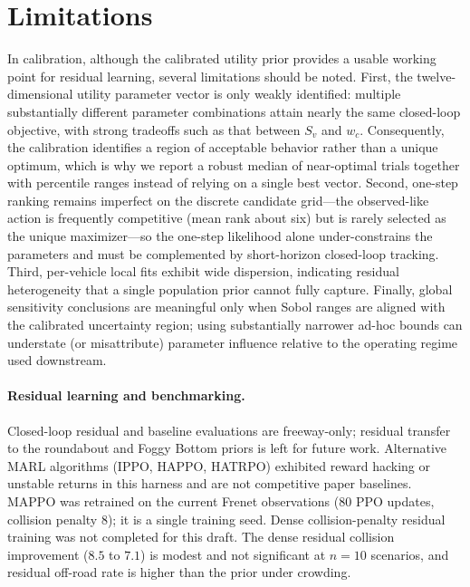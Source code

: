 \documentclass[conference]{IEEEtran}
\begin{document}
\section{Limitations}
In calibration, although the calibrated utility prior provides a usable working point for residual learning, several limitations should be noted. First, the twelve-dimensional utility parameter vector is only weakly identified: multiple substantially different parameter combinations attain nearly the same closed-loop objective, with strong tradeoffs such as that between \(S_v\) and \(w_c\). Consequently, the calibration identifies a region of acceptable behavior rather than a unique optimum, which is why we report a robust median of near-optimal trials together with percentile ranges instead of relying on a single best vector. Second, one-step ranking remains imperfect on the discrete candidate grid---the observed-like action is frequently competitive (mean rank about six) but is rarely selected as the unique maximizer---so the one-step likelihood alone under-constrains the parameters and must be complemented by short-horizon closed-loop tracking. Third, per-vehicle local fits exhibit wide dispersion, indicating residual heterogeneity that a single population prior cannot fully capture. Finally, global sensitivity conclusions are meaningful only when Sobol ranges are aligned with the calibrated uncertainty region; using substantially narrower ad-hoc bounds can understate (or misattribute) parameter influence relative to the operating regime used downstream.

\paragraph{Residual learning and benchmarking.}
Closed-loop residual and baseline evaluations are freeway-only; residual transfer to the roundabout and Foggy Bottom priors is left for future work. Alternative MARL algorithms (IPPO, HAPPO, HATRPO) exhibited reward hacking or unstable returns in this harness and are not competitive paper baselines. MAPPO was retrained on the current Frenet observations (80 PPO updates, collision penalty $8$); it is a single training seed. Dense collision-penalty residual training was not completed for this draft. The dense residual collision improvement ($8.5$ to $7.1$) is modest and not significant at $n=10$ scenarios, and residual off-road rate is higher than the prior under crowding.

 

\end{document}
